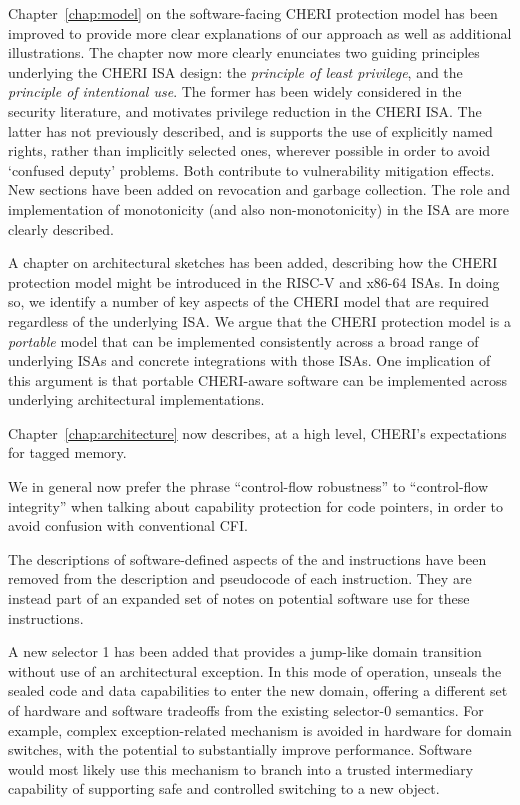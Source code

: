 \begin{description}
  Chapter~\ref{chap:model} on the software-facing CHERI protection model has
  been improved to provide more clear explanations of our approach as well as
  additional illustrations.
  The chapter now more clearly enunciates two guiding principles
  underlying the CHERI ISA design: the \textit{principle of least privilege},
  and the \textit{principle of intentional use}.
  The former has been widely considered in the security literature, and
  motivates privilege reduction in the CHERI ISA.
  The latter has not previously described, and is supports the use of explicitly
  named rights, rather than implicitly selected ones, wherever possible in order
  to avoid `confused deputy' problems.
  Both contribute to vulnerability mitigation effects.
  New sections have been added on revocation and garbage collection.
  The role and implementation of monotonicity (and also non-monotonicity) in
  the ISA are more clearly described.

  A chapter on architectural sketches has been added, describing how the CHERI
  protection model might be introduced in the RISC-V and x86-64 ISAs.
  In doing so, we identify a number of key aspects of the CHERI model that are
  required regardless of the underlying ISA.
  We argue that the CHERI protection model is a \textit{portable} model that can
  be implemented consistently across a broad range of underlying ISAs and
  concrete integrations with those ISAs.
  One implication of this argument is that portable CHERI-aware software can be
  implemented across underlying architectural implementations.

  Chapter~\ref{chap:architecture} now describes, at a high level, CHERI's
  expectations for tagged memory.

  We in general now prefer the phrase ``control-flow robustness'' to
  ``control-flow integrity'' when talking about capability protection for code
  pointers, in order to avoid confusion with conventional CFI.

  The descriptions of software-defined aspects of the  and
   instructions have been removed from the description and
  pseudocode of each instruction.
  They are instead part of an expanded set of notes on potential software use
  for these instructions.

  A new  selector 1 has been added that provides a jump-like
  domain transition without use of an architectural exception.
  In this mode of operation,  unseals the sealed code and
  data capabilities to enter the new domain, offering a different set of
  hardware and software tradeoffs from the existing selector-0 semantics.
  For example, complex exception-related mechanism is avoided in hardware for
  domain switches, with the potential to substantially improve performance.
  Software would most likely use this mechanism to branch into a trusted
  intermediary capability of supporting safe and controlled switching to a new
  object.


\end{description}

